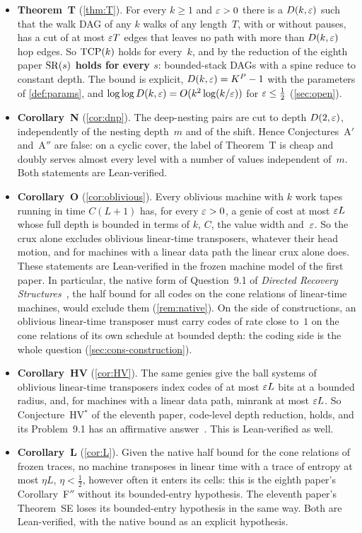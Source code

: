 \begin{itemize}[leftmargin=1.5em]
\item \textbf{Theorem~T} (\cref{thm:T}). For every $k\ge1$ and $\varepsilon>0$ there is a $D(k,\varepsilon)$ such that the walk DAG of any $k$
walks of any length~$T$, with or without pauses, has a cut of at most $\varepsilon T$ edges that leaves no path with more than
$D(k,\varepsilon)$ hop edges. So $\mathrm{TCP}(k)$ holds for every~$k$, and by the reduction of the eighth paper \textbf{$\mathrm{SR}(s)$ holds for every
$s$}: bounded-stack DAGs with a spine reduce to constant depth. The bound is explicit, $D(k,\varepsilon)=K^P-1$ with the parameters of
\cref{def:params}, and $\log\log D(k,\varepsilon)=O(k^2\log(k/\varepsilon))$ for $\varepsilon\le\frac12$ (\cref{sec:open}).
\item \textbf{Corollary~N} (\cref{cor:dnp}). The deep-nesting pairs are cut to depth $D(2,\varepsilon)$, independently of the nesting
depth~$m$ and of the shift. Hence Conjectures~A$'$ and~A$''$ are false: on a cyclic cover, the label of Theorem~T is cheap and
doubly serves almost every level with a number of values independent of~$m$. Both statements are Lean-verified.
\item \textbf{Corollary~O} (\cref{cor:oblivious}). Every oblivious machine with $k$ work tapes running in time $C(L+1)$ has, for
every $\varepsilon>0$, a genie of cost at most $\varepsilon L$ whose full depth is bounded in terms of $k$, $C$, the value width and~$\varepsilon$. So
the crux alone excludes oblivious linear-time transposers, whatever their head motion, and for machines with a linear data path
the linear crux alone does. These statements are Lean-verified in the frozen machine model of the first paper. In particular, the native form of Question~9.1 of \emph{Directed Recovery
Structures}~\cite{DirectedRecovery2026}, the half bound for all codes on the cone relations of linear-time machines, would exclude
them (\cref{rem:native}). On the side of constructions, an oblivious linear-time transposer must carry codes of rate close to~$1$
on the cone relations of its own schedule at bounded depth: the coding side is the whole question (\cref{sec:cons-construction}).
\item \textbf{Corollary~HV} (\cref{cor:HV}). The same genies give the ball systems of oblivious linear-time transposers index
codes of at most $\varepsilon L$ bits at a bounded radius, and, for machines with a linear data path, minrank at most $\varepsilon L$. So
Conjecture~HV$^*$ of the eleventh paper, code-level depth reduction, holds, and its Problem~9.1 has an affirmative
answer~\cite{MergeDepth2026}. This is Lean-verified as well.
\item \textbf{Corollary~L} (\cref{cor:L}). Given the native half bound for the cone relations of frozen traces, no machine
transposes in linear time with a trace of entropy at most $\eta L$, $\eta<\frac12$, however often it enters its cells: this is
the eighth paper's Corollary~F$''$ without its bounded-entry hypothesis. The eleventh paper's Theorem~SE loses its bounded-entry
hypothesis in the same way. Both are Lean-verified, with the native bound as an explicit hypothesis.
\end{itemize}

